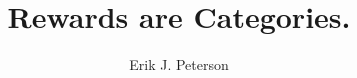 \documentclass[doc,12pt]{apa}        %
\title{Rewards are Categories.}
\author{Erik J. Peterson} \affiliation{Dept. of Psychology \\ Colorado State University \\ Fort Collins, CO}
\begin{document}
\maketitle
\newpage

\newpage
\tableofcontents
\newpage

\doublespace

\newpage

\newpage

\newpage

\newpage


\end{document}
